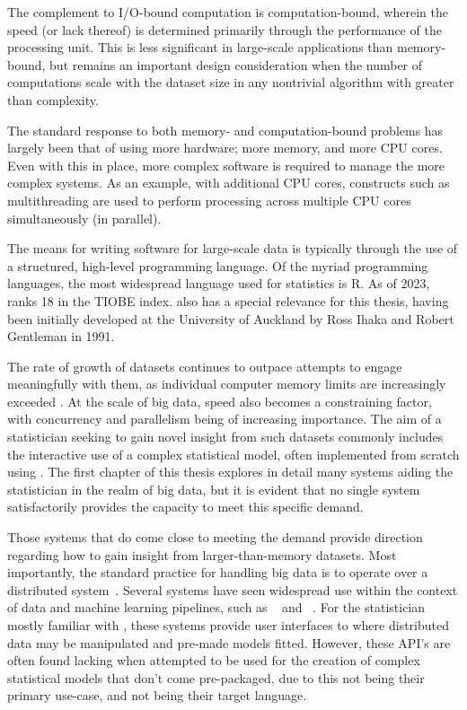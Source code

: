 The complement to I/O-bound computation is computation-bound, wherein the speed (or lack thereof) is determined primarily through the performance of the processing unit.
This is less significant in large-scale applications than memory-bound, but remains an important design consideration when the number of computations scale with the dataset size in any nontrivial algorithm with greater than  complexity.

The standard response to both memory- and computation-bound problems has largely been that of using more hardware; more memory, and more CPU cores.
Even with this in place, more complex software is required to manage the more complex systems.
As an example, with additional CPU cores, constructs such as multithreading are used to perform processing across multiple CPU cores simultaneously (in parallel).

The means for writing software for large-scale data is typically through the use of a structured, high-level programming language.
Of the myriad programming languages, the most widespread language used for statistics is R.
As of 2023, \R{} ranks {18} in the TIOBE index.
\R{} also has a special relevance for this thesis, having been
initially developed at the University of Auckland by Ross Ihaka and
Robert Gentleman in 1991\cite{ihaka1996r}.

The rate of growth of datasets continues to outpace attempts to engage meaningfully with them, as individual computer memory limits are increasingly exceeded \cite{kleppmann2017dataintensive}.
At the scale of big data, speed also becomes a constraining factor, with concurrency and parallelism being of increasing importance.
The aim of a statistician seeking to gain novel insight from such datasets commonly includes the interactive use of a complex statistical model, often implemented from scratch using \R{}.
The first chapter of this thesis explores in detail many systems aiding the statistician in the realm of big data, but it is evident that no single system satisfactorily provides the capacity to meet this specific demand.

Those systems that do come close to meeting the demand provide direction regarding how to gain insight from larger-than-memory datasets.
Most importantly, the standard practice for handling big data is to operate over a distributed system~\cite{boja2012distributed}.
Several systems have seen widespread use within the context of data and machine learning pipelines, such as ~\cite{zaharia2016apache} and ~\cite{shvachko2010hadoop}.
For the statistician mostly familiar with \R{}, these systems provide user interfaces to \R{} where distributed data may be manipulated and pre-made models fitted.
However, these API's are often found lacking when attempted to be used for the creation of complex statistical models that don't come pre-packaged, due to this not being their primary use-case, and \R{} not being their target language.

